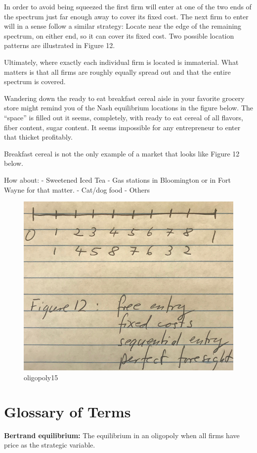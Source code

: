 \documentclass[
]{book}
\begin{document}
In order to avoid being squeezed the first firm will enter at one of the two ends of the spectrum just far enough away to cover its fixed cost. The next firm to enter will in a sense follow a similar strategy: Locate near the edge of the remaining spectrum, on either end, so it can cover its fixed cost. Two possible location patterns are illustrated in Figure 12.

Ultimately, where exactly each individual firm is located is immaterial. What matters is that all firms are roughly equally spread out and that the entire spectrum is covered.

Wandering down the ready to eat breakfast cereal aisle in your favorite grocery store might remind you of the Nash equilibrium locations in the figure below. The ``space'' is filled out it seems, completely, with ready to eat cereal of all flavors, fiber content, sugar content. It seems impossible for any entrepreneur to enter that thicket profitably.

Breakfast cereal is not the only example of a market that looks like Figure 12 below.

How about:
- Sweetened Iced Tea
- Gas stations in Bloomington or in Fort Wayne for that matter.
- Cat/dog food
- Others

\begin{figure}

{\centering \includegraphics[width=0.5\linewidth]{img/oligopoly/fig15} 

}

\caption{oligopoly15}\label{fig:oligopoly15}
\end{figure}

\hypertarget{glossary-of-terms-8}{%
\section{Glossary of Terms}\label{glossary-of-terms-8}}

\textbf{Bertrand equilibrium:} The equilibrium in an oligopoly when all firms have price as the strategic variable.
\end{document}
